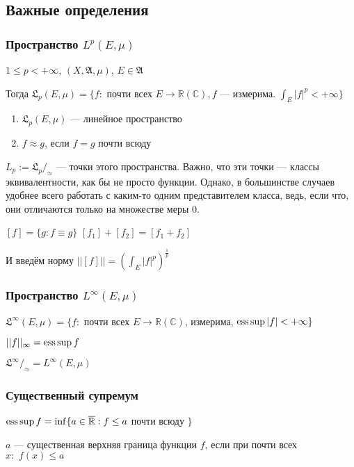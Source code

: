 \documentclass{article}
\def\dbl{\,\,}
\def\rinf{\overline{\mathbb{R}}}
\begin{document}
\subsection{Важные определения}

\subsubsection{Пространство $L^p(E,\mu)$}
$1 \le p < +\infty$, $(X, \mathfrak{A}, \mu)$, $E \in \mathfrak{A}$

Тогда $\mathfrak{L}_p(E, \mu) = \{f:$ почти всех $E \rightarrow \mathbb{R} (\mathbb{C}), f$ --- измерима. $\int_{E} |f|^{p} < + \infty\}$

\begin{enumerate}
    \item $\mathfrak{L}_p(E, \mu)$ --- линейное пространство
    \item $f \approx g$, если $f = g$ почти всюду
\end{enumerate}

$L_p := \mathfrak{L}_p /_{\approx}$ --- точки этого пространства. Важно, что эти точки --- классы эквивалентности, как бы не просто функции. Однако, в большинстве случаев удобнее всего работать с каким-то одним представителем класса, ведь, если что, они отличаются только на множестве меры 0.

$[f] = \{g: f \equiv g\}$
$[f_1] + [f_2] = [f_1 + f_2]$

И введём норму $||[f]|| = \left(\int_{E} |f|^{p}\right)^{\frac{1}{p}}$

\subsubsection{Пространство $L^\infty(E,\mu)$}

$\mathfrak{L}^{\infty}(E, \mu) = \{f: $ почти всех $E \rightarrow \mathbb{R} (\mathbb{C})$, измерима, $\operatorname*{ess\,sup} |f| < + \infty\}$

$||f||_{\infty} = \operatorname*{ess\,sup} f$

$\mathfrak{L}^{\infty} /_\approx = L^{\infty}(E, \mu)$

\subsubsection{Существенный супремум}

$\esssup f = \inf \{a \in \rinf: f \le a $ почти всюду $\}$

$a$ --- существенная верхняя граница функции $f$, если при почти всех $x: \dbl f(x) \le a$
\end{document}
